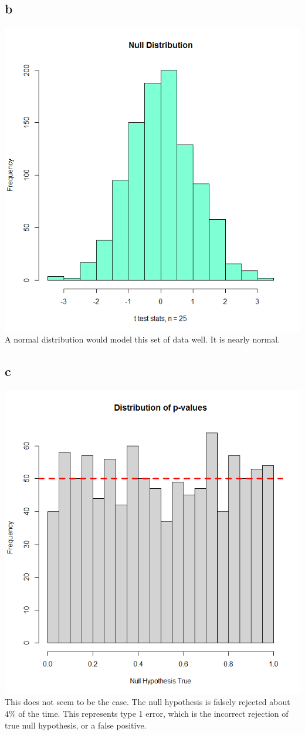 \documentclass[10pt,letterpaper]{article}
\begin{document}
\subsection*{b}
\includegraphics[scale=.5]{null-dist}\\
A normal distribution would model this set of data well. It is nearly normal.

\subsection*{c}
\includegraphics[scale=.5]{p-dist}\\
This does not seem to be the case. The null hypothesis is falsely rejected 
about $4\%$ of the time. This represents type 1 error, which is the incorrect
rejection of true null hypothesis, or a false positive. 
\end{document}
